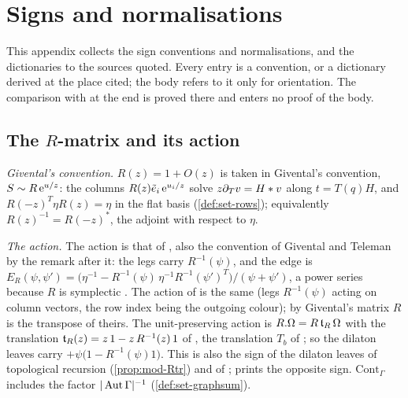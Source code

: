 \section{Signs and normalisations}
\label{sec:sgn}

This appendix collects the sign conventions and normalisations, and the dictionaries to the sources quoted. Every entry is a convention, or a dictionary derived at the place cited; the body refers to it only for orientation. The comparison with \cite{CGYZ26} at the end is proved there and enters no proof of the body.

\subsection{The \texorpdfstring{$R$}{R}-matrix and its action}
\label{sec:sgn-R}

\emph{Givental's convention.} $R(z)=1+O(z)$ is taken in Givental's convention, $S\sim R\,\mathrm{e}^{u/z}$: the columns $R(z)\tilde e_i\,\mathrm{e}^{u_i/z}$ solve $z\partial_Tv=H*v$ along $t=T(q)H$, and $R(-z)^T\eta R(z)=\eta$ in the flat basis (\cref{def:set-rows}); equivalently $R(z)^{-1}=R(-z)^*$, the adjoint with respect to $\eta$.

\emph{The action.} The action is that of \cite[Def.~2.2]{PPZ15}, also the convention of Givental and Teleman by the remark after it: the legs carry $R^{-1}(\psi)$, and the edge is $E_R(\psi,\psi')=\bigl(\eta^{-1}-R^{-1}(\psi)\,\eta^{-1}R^{-1}(\psi')^T\bigr)/(\psi+\psi')$, a power series because $R$ is symplectic \cite[Remark~2.1, (6)]{PPZ15}. The action of \cite[\S2.3]{Dunin-Barkowski:2015caa} is the same (legs $R^{-1}(\psi)$ acting on column vectors, the row index being the outgoing colour); by \cite[Remark~2.1]{Dunin-Barkowski:2015caa} Givental's matrix $R$ is the transpose of theirs. The unit-preserving action is $R.\Omega=R\,\mathfrak{t}_R\,\Omega$ with the translation $\mathfrak{t}_R(z)=z\,1-z\,R^{-1}(z)\,1$ of \cite[Def.~2.13]{PPZ15}, the translation $T_b$ of \cite[Prop.~2.12]{PPZ15}; so the dilaton leaves carry $+\psi\bigl(1-R^{-1}(\psi)1\bigr)$. This is also the sign of the dilaton leaves of topological recursion (\cref{prop:mod-Rtr}) and of \cite[\S2.3]{DuninBarkowski:2012bw}; \cite[\S2.3]{Dunin-Barkowski:2015caa} prints the opposite sign. $\mathrm{Cont}_\Gamma$ includes the factor $|\operatorname{Aut}\Gamma|^{-1}$ (\cref{def:set-graphsum}).

